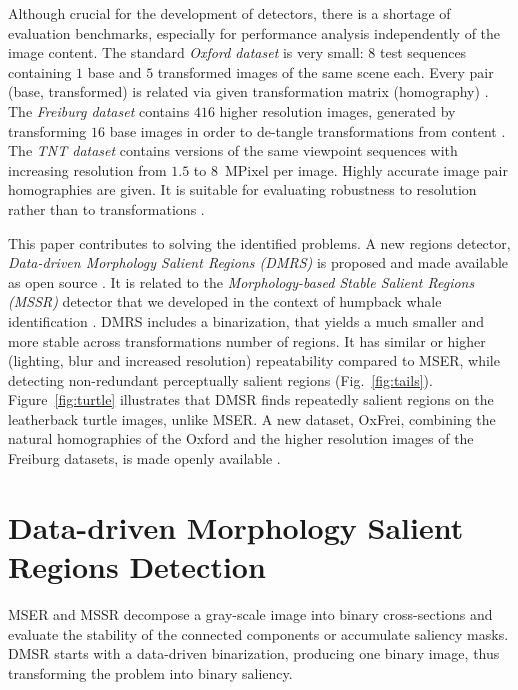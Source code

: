 \documentclass{article}
\begin{document}
Although crucial for the development of detectors, there is a shortage of evaluation benchmarks, especially for performance analysis independently of the image content. The standard {\em Oxford dataset} is very small: $8$ test sequences containing $1$ base and $5$ transformed images of the same scene each. Every pair (base, transformed) is related via given transformation matrix (homography) \cite{Mikolajczyk:2005}.  The {\em Freiburg dataset} contains $416$ higher resolution images, generated by transforming $16$ base images in order to de-tangle transformations from content \cite{FischerDB14}.  
The {\em TNT dataset} contains versions of the same viewpoint sequences with increasing resolution from $1.5$ to $8$~MPixel per image. Highly accurate image pair homographies are given. It is suitable for evaluating robustness to resolution rather than to transformations \cite{CorRos2013}. 

This paper contributes to solving the identified problems. A new regions detector, {\em Data-driven Morphology Salient Regions (DMRS)} is proposed and made available as open source \cite{Rang:software}. It is related to the {\em Morphology-based Stable Salient Regions (MSSR)} detector that we developed in the context of humpback whale identification \cite{RangMSSR06, RangHumpb06}. DMRS includes a binarization, %
that yields a much smaller and more stable across transformations number of regions. It has similar or higher (lighting, blur and increased resolution) repeatability compared to MSER, while detecting non-redundant perceptually salient regions (Fig.~\ref{fig:tails}). Figure~\ref{fig:turtle} illustrates that DMSR finds repeatedly salient regions on the leatherback turtle images, unlike MSER. A new dataset, OxFrei, combining the natural homographies of the Oxford and the higher resolution images of the Freiburg datasets, is made openly available \cite{Rang:dataset}.

\section{Data-driven Morphology Salient Regions Detection}
\label{sec:DMSR}

MSER and MSSR decompose a gray-scale image into binary cross-sections and evaluate the stability of the connected components or accumulate saliency masks. DMSR starts with a data-driven binarization, producing one binary image, thus transforming the problem into binary saliency.
\end{document}

